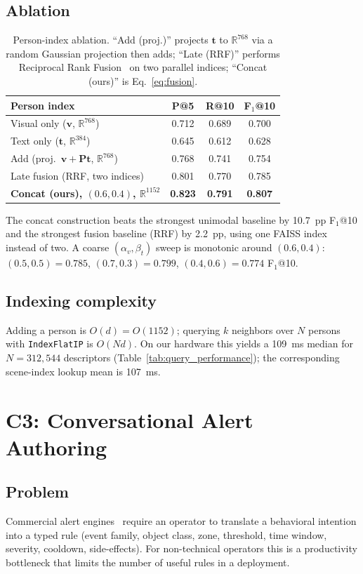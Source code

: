 ﻿\documentclass[conference]{IEEEtran}
\theoremstyle{definition}
\begin{document}
\subsection{Ablation}
\begin{table}[!t]
\caption{Person-index ablation. ``Add (proj.)'' projects $\mathbf{t}$ to $\mathbb{R}^{768}$ via a random Gaussian projection then adds; ``Late (RRF)'' performs Reciprocal Rank Fusion~\cite{b27} on two parallel indices; ``Concat (ours)'' is Eq.~\eqref{eq:fusion}.}
\label{tab:fusion_ablation}
\centering
\footnotesize
\begin{tabular}{@{}lccc@{}}
\toprule
Person index & P@5 & R@10 & F$_1$@10 \\
\midrule
Visual only ($\mathbf{v}$, $\mathbb{R}^{768}$) & 0.712 & 0.689 & 0.700 \\
Text only ($\mathbf{t}$, $\mathbb{R}^{384}$)    & 0.645 & 0.612 & 0.628 \\
Add (proj.\ $\mathbf{v}+\mathbf{P}\mathbf{t}$, $\mathbb{R}^{768}$) & 0.768 & 0.741 & 0.754 \\
Late fusion (RRF, two indices) & 0.801 & 0.770 & 0.785 \\
\textbf{Concat (ours), $(0.6,0.4)$, $\mathbb{R}^{1152}$} & \textbf{0.823} & \textbf{0.791} & \textbf{0.807} \\
\bottomrule
\end{tabular}
\end{table}
The concat construction beats the strongest unimodal baseline by 10.7~pp F$_1$@10 and the strongest fusion baseline (RRF) by 2.2~pp, using one FAISS index instead of two. A coarse $(\alpha_v,\beta_t)$ sweep is monotonic around $(0.6,0.4)$: $(0.5,0.5){=}0.785$, $(0.7,0.3){=}0.799$, $(0.4,0.6){=}0.774$ F$_1$@10.

\subsection{Indexing complexity}
Adding a person is $O(d)=O(1152)$; querying $k$ neighbors over $N$ persons with \texttt{IndexFlatIP} is $O(Nd)$. On our hardware this yields a 109~ms median for $N=312{,}544$ descriptors (Table~\ref{tab:query_performance}); the corresponding scene-index lookup mean is 107~ms.

\section{C3: Conversational Alert Authoring}\label{sec:alert_grammar}

\subsection{Problem}
Commercial alert engines~\cite{b7,b8,b12} require an operator to translate a behavioral intention into a typed rule (event family, object class, zone, threshold, time window, severity, cooldown, side-effects). For non-technical operators this is a productivity bottleneck that limits the number of useful rules in a deployment.
\end{document}
